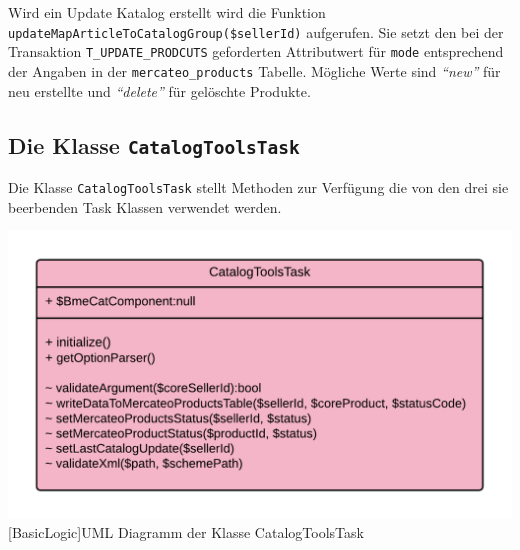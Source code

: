 	Wird ein Update Katalog erstellt wird die Funktion \texttt{updateMapArticleToCatalogGroup(\$sellerId)} aufgerufen. Sie setzt den bei der Transaktion \texttt{T\_UPDATE\_PRODCUTS} geforderten Attributwert für \texttt{mode} entsprechend der Angaben in der \texttt{mercateo\_products} Tabelle.
	Mögliche Werte sind \textit{\enquote{new}} für neu erstellte und \textit{\enquote{delete}} für gelöschte Produkte.
	
	\subsection{Die Klasse \texttt{CatalogToolsTask}}
	
	Die Klasse \texttt{CatalogToolsTask} stellt Methoden zur Verfügung die von den drei sie beerbenden Task Klassen verwendet werden.
	
	\begin{minipage}{\linewidth}
		\vspace{1em}
		\centering
		\includegraphics[width=0.7 \linewidth]{img/CatalogToolsTaskUML}
		[BasicLogic]{UML Diagramm der Klasse CatalogToolsTask}
		\vspace{1em}
	\end{minipage}
	
